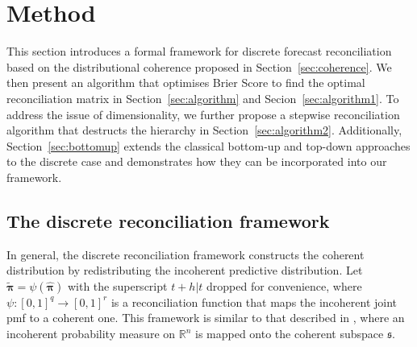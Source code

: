 \documentclass[a4paper,review,12pt,authoryear]{elsarticle}
\newcommand{\bpi}{\bm{\pi}}
\begin{document}
\section{Method}
\label{sec:method}

This section introduces a formal framework for discrete forecast reconciliation based on the distributional coherence proposed in Section~\ref{sec:coherence}.
We then present an algorithm that optimises Brier Score to find the optimal reconciliation matrix in Section~\ref{sec:algorithm} and Secion~\ref{sec:algorithm1}.
To address the issue of dimensionality, we further propose a stepwise reconciliation algorithm that destructs the hierarchy in Section~\ref{sec:algorithm2}.
Additionally, Section~\ref{sec:bottomup} extends the classical bottom-up and top-down approaches to the discrete case and demonstrates how they can be incorporated into our framework.

    \subsection{The discrete reconciliation framework}

    In general, the discrete reconciliation framework constructs the coherent distribution by redistributing the incoherent predictive distribution.
    Let $\tilde{\bpi} = \psi(\hat{\bpi})$ with the superscript $t+h|t$ dropped for convenience, where $\psi:[0,1]^q \rightarrow [0,1]^r$ is a reconciliation function that maps the incoherent joint pmf to a coherent one.
    This framework is similar to that described in \cite{panagiotelisProbabilisticForecastReconciliation2022}, where an incoherent probability measure on $\mathbb{R}^n$ is mapped onto the coherent subspace $\mathfrak{s}$.
\end{document}

